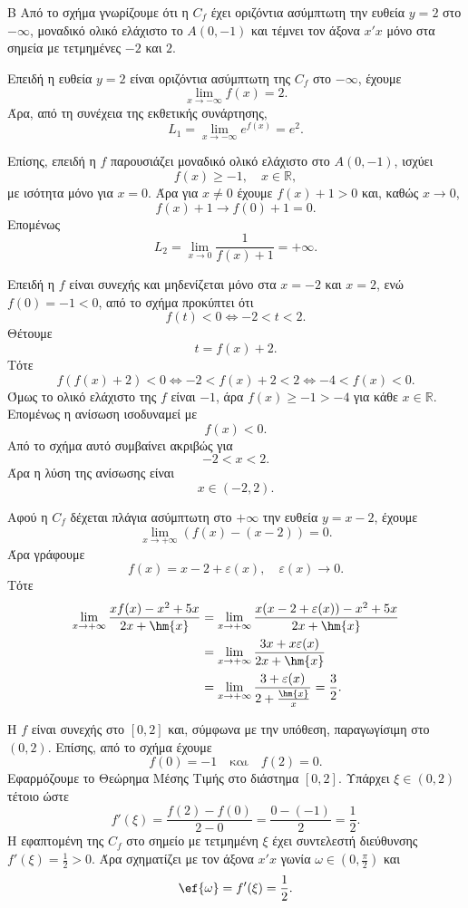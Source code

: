 

\begin{thema}{Β}
Από το σχήμα γνωρίζουμε ότι η $C_f$ έχει οριζόντια ασύμπτωτη την ευθεία $y=2$ στο $-\infty$, μοναδικό ολικό ελάχιστο το $A(0,-1)$ και τέμνει τον άξονα $x'x$ μόνο στα σημεία με τετμημένες $-2$ και $2$.

\begin{erwthma}
\item Επειδή η ευθεία $y=2$ είναι οριζόντια ασύμπτωτη της $C_f$ στο $-\infty$, έχουμε
\[
\lim_{x\to-\infty}f(x)=2.
\]
Άρα, από τη συνέχεια της εκθετικής συνάρτησης,
\[
L_1=\lim_{x\to-\infty}e^{f(x)}=e^2.
\]

Επίσης, επειδή η $f$ παρουσιάζει μοναδικό ολικό ελάχιστο στο $A(0,-1)$, ισχύει
\[
f(x)\geq -1,\quad x\in\mathbb{R},
\]
με ισότητα μόνο για $x=0$. Άρα για $x\neq 0$ έχουμε $f(x)+1>0$ και, καθώς $x\to 0$,
\[
f(x)+1\to f(0)+1=0.
\]
Επομένως
\[
L_2=\lim_{x\to 0}\frac{1}{f(x)+1}=+\infty.
\]

\item Επειδή η $f$ είναι συνεχής και μηδενίζεται μόνο στα $x=-2$ και $x=2$, ενώ $f(0)=-1<0$, από το σχήμα προκύπτει ότι
\[
f(t)<0 \Leftrightarrow -2<t<2.
\]
Θέτουμε
\[
t=f(x)+2.
\]
Τότε
\[
f(f(x)+2)<0
\Leftrightarrow
-2<f(x)+2<2
\Leftrightarrow
-4<f(x)<0.
\]
Όμως το ολικό ελάχιστο της $f$ είναι $-1$, άρα $f(x)\geq -1>-4$ για κάθε $x\in\mathbb{R}$. Επομένως η ανίσωση ισοδυναμεί με
\[
f(x)<0.
\]
Από το σχήμα αυτό συμβαίνει ακριβώς για
\[
-2<x<2.
\]
Άρα η λύση της ανίσωσης είναι
\[
x\in(-2,2).
\]

\item Αφού η $C_f$ δέχεται πλάγια ασύμπτωτη στο $+\infty$ την ευθεία $y=x-2$, έχουμε
\[
\lim_{x\to+\infty}\left(f(x)-(x-2)\right)=0.
\]
Άρα γράφουμε
\[
f(x)=x-2+\varepsilon(x),\quad \varepsilon(x)\to 0.
\]
Τότε
\begin{align*}
\lim_{x\to+\infty}\frac{x f(x)-x^2+5x}{2x+\hm{x}}
&=\lim_{x\to+\infty}
\frac{x(x-2+\varepsilon(x))-x^2+5x}{2x+\hm{x}}\\
&=\lim_{x\to+\infty}
\frac{3x+x\varepsilon(x)}{2x+\hm{x}}\\
&=\lim_{x\to+\infty}
\frac{3+\varepsilon(x)}{2+\frac{\hm{x}}{x}}
=\frac{3}{2}.
\end{align*}

\item Η $f$ είναι συνεχής στο $[0,2]$ και, σύμφωνα με την υπόθεση, παραγωγίσιμη στο $(0,2)$. Επίσης, από το σχήμα έχουμε
\[
f(0)=-1
\quad\text{και}\quad
f(2)=0.
\]
Εφαρμόζουμε το Θεώρημα Μέσης Τιμής στο διάστημα $[0,2]$. Υπάρχει $\xi\in(0,2)$ τέτοιο ώστε
\[
f'(\xi)=\frac{f(2)-f(0)}{2-0}
=\frac{0-(-1)}{2}
=\frac{1}{2}.
\]
Η εφαπτομένη της $C_f$ στο σημείο με τετμημένη $\xi$ έχει συντελεστή διεύθυνσης $f'(\xi)=\frac12>0$. Άρα σχηματίζει με τον άξονα $x'x$ γωνία $\omega\in\left(0,\frac{\pi}{2}\right)$ και
\[
\ef{\omega}=f'(\xi)=\frac{1}{2}.
\]
\end{erwthma}
\end{thema}

